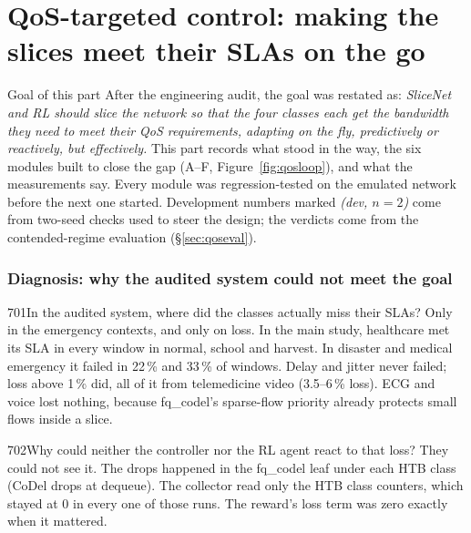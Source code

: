 \part{QoS-targeted control: making the slices meet their SLAs on the go}

\begin{keybox}{Goal of this part}
After the engineering audit, the goal was restated as: \emph{SliceNet and RL should slice the network so that the four
classes each get the bandwidth they need to meet their QoS requirements, adapting on the fly, predictively or
reactively, but effectively.} This part records what stood in the way, the six modules built to close the gap
(A–F, Figure~\ref{fig:qosloop}), and what the measurements say. Every module was regression-tested on the emulated
network before the next one started. Development numbers marked \emph{(dev, $n{=}2$)} come from two-seed checks
used to steer the design; the verdicts come from the contended-regime evaluation (\S\ref{sec:qoseval}).
\end{keybox}

\FigQosLoop

\section{Diagnosis: why the audited system could not meet the goal}

\begin{qa}{701}{In the audited system, where did the classes actually miss their SLAs?}
Only in the emergency contexts, and only on loss. In the main study, healthcare met its SLA in every window in normal,
school and harvest. In disaster and medical emergency it failed in 22\,\% and 33\,\% of windows. Delay and jitter never
failed; loss above 1\,\% did, all of it from telemedicine video (3.5–6\,\% loss). ECG and voice lost nothing, because
fq\_codel's sparse-flow priority already protects small flows inside a slice.
\end{qa}

\begin{qa}{702}{Why could neither the controller nor the RL agent react to that loss?}
They could not see it. The drops happened in the fq\_codel leaf under each HTB class (CoDel drops at dequeue). The
collector read only the HTB class counters, which stayed at 0 in every one of those runs. The reward's loss term was
zero exactly when it mattered.
\end{qa}

